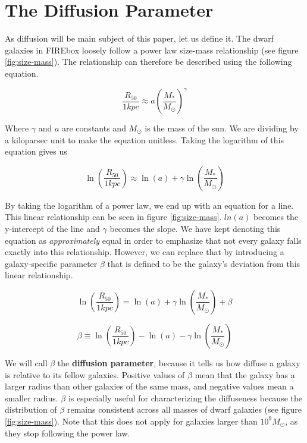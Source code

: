 \section{The Diffusion Parameter}
As diffusion will be main subject of this paper, let us define it. The dwarf galaxies in FIREbox loosely follow a power law size-mass relationship (see figure \ref{fig:size-mass}). The relationship can therefore be described using the following equation.

\begin{equation}
    \frac{R_{50}}{1 kpc} \approx a
    \left(
        \frac{M_*}{M_\odot}
    \right)
    ^{\gamma}
\end{equation}

Where $\gamma$ and $a$ are constants and $M_\odot$ is the mass of the sun. We are dividing by a kiloparsec unit to make the equation unitless. Taking the logarithm of this equation gives us

\begin{equation}
    \ln \left(
        \frac{R_{50}}{1 kpc}
    \right)
    \approx
    \ln(a)
    + \gamma \ln \left(
        \frac{M_*}{M_\odot}
    \right)
\end{equation} \label{equ:linear-rel}

By taking the logarithm of a power law, we end up with an equation for a line. This linear relationship can be seen in figure \ref{fig:size-mass}. $ln(a)$ becomes the y-intercept of the line and $\gamma$ becomes the slope. We have kept denoting this equation as \emph{approximately} equal in order to emphasize that not every galaxy falls exactly into this relationship. However, we can replace that by introducing a galaxy-specific parameter $\beta$ that is defined to be the galaxy's deviation from this linear relationship.

\begin{equation}
    \ln \left(
        \frac{R_{50}}{1 kpc}
    \right)
    =
    \ln(a)
    + \gamma \ln \left(
        \frac{M_*}{M_\odot}
    \right)
    + \beta
\end{equation}

\begin{equation}
    \beta
    \equiv
    \ln \left(
        \frac{R_{50}}{1 kpc}
    \right)
    -
    \ln(a)
    - \gamma \ln \left(
        \frac{M_*}{M_\odot}
    \right)
\end{equation} \label{equ:beta}

We will call $\beta$ the \textbf{diffusion parameter}, because it tells us how diffuse a galaxy is relative to its fellow galaxies. Positive values of $\beta$ mean that the galaxy has a larger radius than other galaxies of the same mass, and negative values mean a smaller radius. $\beta$ is especially useful for characterizing the diffuseness because the distribution of $\beta$ remains consistent across all masses of dwarf galaxies (see figure \ref{fig:size-mass}). Note that this does not apply for galaxies larger than $10^9 M_\odot$, as they stop following the power law.

